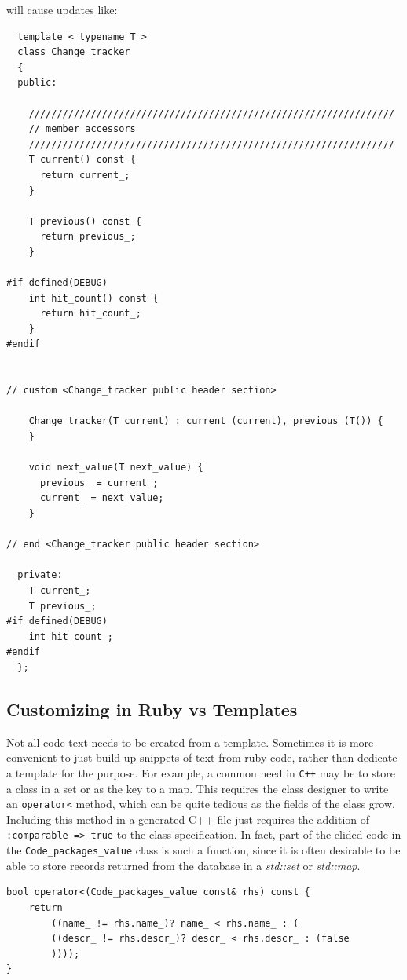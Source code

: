 \documentclass[11pt]{article}
\begin{document}
   will cause updates like:


\lstset{language=C++}
\begin{lstlisting}
  template < typename T > 
  class Change_tracker 
  {
  public:

    /////////////////////////////////////////////////////////////////
    // member accessors
    /////////////////////////////////////////////////////////////////
    T current() const {
      return current_;
    }

    T previous() const {
      return previous_;
    }

#if defined(DEBUG)
    int hit_count() const {
      return hit_count_;
    }
#endif

  
// custom <Change_tracker public header section>

    Change_tracker(T current) : current_(current), previous_(T()) {
    }

    void next_value(T next_value) {
      previous_ = current_;
      current_ = next_value;
    }

// end <Change_tracker public header section>

  private:
    T current_;
    T previous_;
#if defined(DEBUG)
    int hit_count_;
#endif
  };
\end{lstlisting}




\subsection{Customizing in \textbf{Ruby} vs \textbf{Templates}}
\label{sec-5.1}


   Not all code text needs to be created from a template. Sometimes it
   is more convenient to just build up snippets of text from ruby
   code, rather than dedicate a template for the purpose.  For
   example, a common need in \texttt{C++} may be to store a class in a set or
   as the key to a map. This requires the class designer to write an
   \texttt{operator<} method, which can be quite tedious as the fields of the
   class grow. Including this method in a generated C++ file just
   requires the addition of \texttt{:comparable => true} to the class
   specification. In fact, part of the elided code in the
   \texttt{Code\_packages\_value} class is such a function, since it is often
   desirable to be able to store records returned from the database in
   a \emph{std::set} or \emph{std::map}.


\lstset{language=C++}
\begin{lstlisting}
bool operator<(Code_packages_value const& rhs) const {
    return
        ((name_ != rhs.name_)? name_ < rhs.name_ : (
        ((descr_ != rhs.descr_)? descr_ < rhs.descr_ : (false
        ))));
}
\end{lstlisting}
\end{document}
